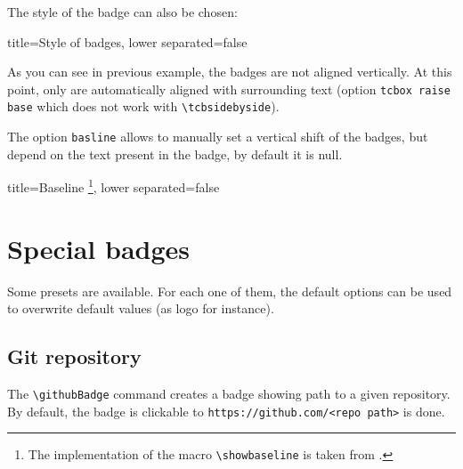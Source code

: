 \vspace{\baselineskip}

The style of the badge can also be chosen:

\begin{tcblisting}{title={Style of badges}, lower separated=false}
\end{tcblisting}

As you can see in previous example, the badges are not aligned vertically.
At this point, only  are automatically aligned with surrounding text (option \texttt{tcbox raise base} which does not work with \texttt{\textbackslash tcbsidebyside}).

The option \texttt{basline} allows to manually set a vertical shift of the badges, but depend on the text present in the badge, by default it is null.

\begin{tcblisting}{
    title={Baseline%
        \footnote{The implementation of the macro \texttt{\textbackslash showbaseline} is taken from .}},
    lower separated=false}
\end{tcblisting}




\section{Special badges}
\label{sec:special-badges}


Some presets are available.
For each one of them, the default options can be used to overwrite default values (as logo for instance).

\subsection{Git repository}

The \texttt{\textbackslash githubBadge} command creates a badge showing path to a given repository.
By default, the badge is clickable to \texttt{https://github.com/<repo path>} is done.


